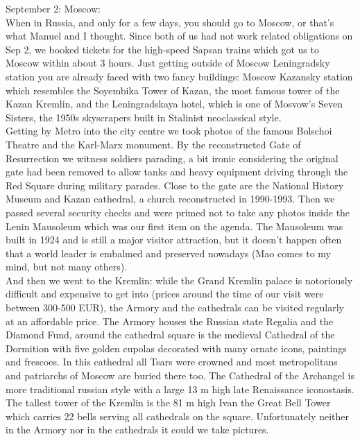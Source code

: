 September 2: Moscow:\\
When in Russia, and only for a few days, you should go to Moscow, or that's what Manuel and I thought. Since both of us had not work related obligations on Sep 2, we booked tickets for the high-speed Sapsan trains which got us to Moscow within about 3 hours. Just getting outside of Moscow Leningradsky station you are already faced with two fancy buildings: Moscow Kazansky station which resembles the Soyembika Tower of Kazan, the most famous tower of the Kazan Kremlin, and the Leningradskaya hotel, which is one of Mosvow's Seven Sisters, the 1950s skyscrapers built in Stalinist neoclassical style.\\
Getting by Metro into the city centre we took photos of the famous Bolschoi Theatre and the Karl-Marx monument. By the reconstructed Gate of Resurrection we witness soldiers parading, a bit ironic considering the original gate had been removed to allow tanks and heavy equipment driving through the Red Square during military parades. Close to the gate are the National History Museum and Kazan cathedral, a church reconstructed in 1990-1993. Then we passed several security checks and were primed not to take any photos inside the Lenin Mausoleum which was our first item on the agenda. The Mausoleum was built in 1924 and is still a major visitor attraction, but it doesn't happen often that a world leader is embalmed and preserved nowadays (Mao comes to my mind, but not many others).\\
And then we went to the Kremlin: while the Grand Kremlin palace is notoriously difficult and expensive to get into (prices around the time of our visit were between 300-500 EUR), the Armory and the cathedrals can be visited regularly at an affordable price. The Armory houses the Russian state Regalia and the Diamond Fund, around the cathedral square is the medieval Cathedral of the Dormition with five golden cupolas decorated with many ornate icons, paintings and frescoes. In this cathedral all Tsars were crowned and most metropolitans and patriarchs of Moscow are buried there too. The Cathedral of the Archangel is more traditional russian style with a large 13 m high late Renaissance iconostasis. The tallest tower of the Kremlin is the 81 m high Ivan the Great Bell Tower which carries 22 bells serving all cathedrals on the square. Unfortunately neither in the Armory nor in the cathedrals it could we take pictures.\\
